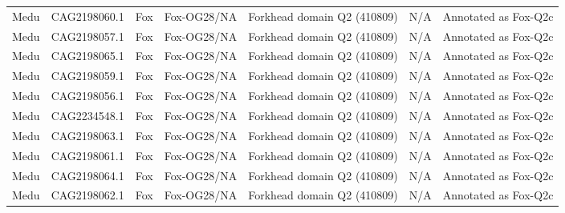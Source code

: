 \documentclass[../main.tex]{subfiles}
\begin{document}
\begin{landscape}
\begin{longtable}{lllllll}
		Medu           & CAG2198060.1          & Fox            & Fox-OG28/NA         & Forkhead domain Q2 (410809)                 & N/A                                                                    & Annotated as Fox-Q2c \\
		Medu           & CAG2198057.1          & Fox            & Fox-OG28/NA         & Forkhead domain Q2 (410809)                 & N/A                                                                    & Annotated as Fox-Q2c \\
		Medu           & CAG2198065.1          & Fox            & Fox-OG28/NA         & Forkhead domain Q2 (410809)                 & N/A                                                                    & Annotated as Fox-Q2c \\
		Medu           & CAG2198059.1          & Fox            & Fox-OG28/NA         & Forkhead domain Q2 (410809)                 & N/A                                                                    & Annotated as Fox-Q2c \\
		Medu           & CAG2198056.1          & Fox            & Fox-OG28/NA         & Forkhead domain Q2 (410809)                 & N/A                                                                    & Annotated as Fox-Q2c \\
		Medu           & CAG2234548.1          & Fox            & Fox-OG28/NA         & Forkhead domain Q2 (410809)                 & N/A                                                                    & Annotated as Fox-Q2c \\
		Medu           & CAG2198063.1          & Fox            & Fox-OG28/NA         & Forkhead domain Q2 (410809)                 & N/A                                                                    & Annotated as Fox-Q2c \\
		Medu           & CAG2198061.1          & Fox            & Fox-OG28/NA         & Forkhead domain Q2 (410809)                 & N/A                                                                    & Annotated as Fox-Q2c \\
		Medu           & CAG2198064.1          & Fox            & Fox-OG28/NA         & Forkhead domain Q2 (410809)                 & N/A                                                                    & Annotated as Fox-Q2c \\
		Medu           & CAG2198062.1          & Fox            & Fox-OG28/NA         & Forkhead domain Q2 (410809)                 & N/A                                                                    & Annotated as Fox-Q2c \\

\end{longtable}
\end{landscape}
\end{document}
